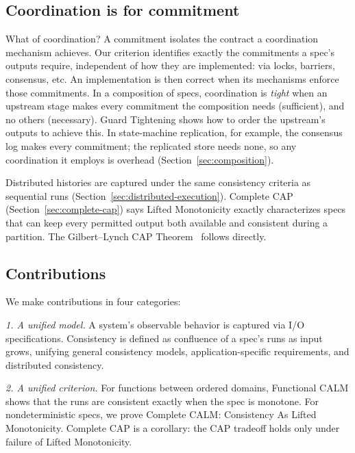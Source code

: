 \documentclass[sigconf]{cidr-2027}
\theoremstyle{remark}
\newcommand{\commitment}{commitment\xspace}
\newcommand{\commitments}{commitments\xspace}
\newcommand{\spectype}[1][]{I/O specification#1\xspace}
\begin{document}
\subsection{Coordination is for \commitment}
\textcolor{reviewed}{What of coordination?} \textcolor{reviewed}{A \commitment isolates the contract a coordination
mechanism achieves.} \textcolor{reviewed}{Our criterion identifies exactly the \commitments a
spec's outputs require, independent of how they are implemented: via locks,
barriers, consensus, etc.} \textcolor{reviewed}{An implementation is then correct when its
mechanisms enforce those \commitments.} \textcolor{reviewed}{In a composition of specs, coordination is \emph{tight}
when an upstream stage makes every \commitment the composition needs (sufficient), and no others (necessary).} \textcolor{reviewed}{Guard Tightening shows how to order the upstream's outputs to achieve this.} \textcolor{reviewed}{In state-machine replication, for example, the consensus log
makes every \commitment; the replicated store needs none, so any coordination it employs is overhead (Section~\ref{sec:composition}).}

\textcolor{reviewed}{Distributed histories are captured under the same consistency criteria as
sequential runs (Section~\ref{sec:distributed-execution}).} \textcolor{reviewed}{Complete CAP
(Section~\ref{sec:complete-cap}) says Lifted Monotonicity exactly characterizes specs
that can keep every permitted output both available and consistent during a
partition.} \textcolor{reviewed}{The Gilbert--Lynch CAP Theorem~\cite{gilbert2002cap} follows directly.}

\subsection{Contributions}
\textcolor{reviewed}{We make contributions in four categories:}

\noindent
\emph{1. A unified model.} A system's observable behavior is captured via
        \spectype[s]. \textcolor{reviewed}{Consistency is defined as
        confluence of a spec's runs as input grows, unifying general consistency models,
        application-specific requirements, and distributed consistency.}

\textcolor{reviewed}{\noindent
\emph{2. A unified criterion.} For functions between ordered domains,
        Functional CALM shows that the runs are consistent exactly when the spec is monotone.} \textcolor{reviewed}{For nondeterministic specs,
        we prove Complete CALM: Consistency As Lifted Monotonicity.} \textcolor{reviewed}{Complete CAP is a corollary:
        the CAP tradeoff holds only under failure of Lifted Monotonicity.}
\end{document}
